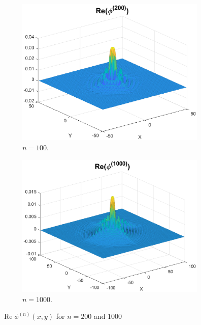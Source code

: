 \documentclass[11pt, letter]{book}
\newenvironment{example}
  {\pushQED{\qed}\renewcommand{\qedsymbol}{$\triangle$}\examplex}
  {\popQED\endexamplex}
\renewcommand\Re{\operatorname{Re}}%
\begin{document}
\begin{example}
\begin{figure}[!htb]
    \begin{subfigure}{0.49\textwidth}
    \centering
    \includegraphics[scale=0.58]{Fig6a.eps}
    \caption{$n = 100$.}
    \label{fig:Conv_Pwr_00a}
    \end{subfigure}
    \begin{subfigure}{0.49\textwidth}
    \centering
    \includegraphics[scale=0.58]{Fig6b.eps}
    \caption{$n = 1000$.}
    \label{fig:Conv_Pwr_00b}
    \end{subfigure}
    \caption{$\Re\phi^{(n)}(x,y)$ for $n=200$ and $1000$}
    \label{fig:Conv_Pwr_00_new}
\end{figure}
\end{example}
\end{document}
